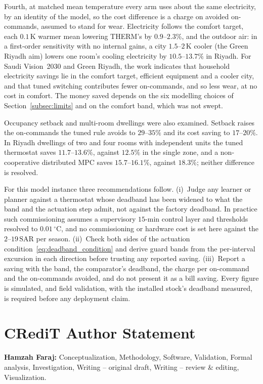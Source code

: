 \documentclass[3p,twocolumn,number]{elsarticle}
\newcommand{\SAR}{\text{SAR}}
\begin{document}
Fourth, at matched mean temperature every arm uses about the same electricity, by an identity of the model, so the cost difference is a charge on avoided on-commands, assumed to stand for wear. Electricity follows the comfort target, each $0.1\,$K warmer mean lowering THERM's by $0.9$--$2.3\%$, and the outdoor air: in a first-order sensitivity with no internal gains, a city $1.5$--$2\,$K cooler (the Green Riyadh aim) lowers one room's cooling electricity by $10.5$--$13.7\%$ in Riyadh. For Saudi Vision~2030 and Green Riyadh, the work indicates that household electricity savings lie in the comfort target, efficient equipment and a cooler city, and that tuned switching contributes fewer on-commands, and so less wear, at no cost in comfort. The money saved depends on the six modelling choices of Section~\ref{subsec:limits} and on the comfort band, which was not swept.

Occupancy setback and multi-room dwellings were also examined. Setback raises the on-commands the tuned rule avoids to $29$--$35\%$ and its cost saving to $17$--$20\%$. In Riyadh dwellings of two and four rooms with independent units the tuned thermostat saves $11.7$--$13.6\%$, against $12.5\%$ in the single zone, and a non-cooperative distributed MPC saves $15.7$--$16.1\%$, against $18.3\%$; neither difference is resolved.

For this model instance three recommendations follow. (i)~Judge any learner or planner against a thermostat whose deadband has been widened to what the band and the actuation step admit, not against the factory deadband. In practice such commissioning assumes a supervisory $15$-min control layer and thresholds resolved to $0.01\,^\circ$C, and no commissioning or hardware cost is set here against the $2$--$19\,\SAR$ per season. (ii)~Check both sides of the actuation condition~\eqref{eq:deadband_condition} and derive guard bands from the per-interval excursion in each direction before trusting any reported saving. (iii)~Report a saving with the band, the comparator's deadband, the charge per on-command and the on-commands avoided, and do not present it as a bill saving. Every figure is simulated, and field validation, with the installed stock's deadband measured, is required before any deployment claim.

\section{CRediT Author Statement}
\textbf{Hamzah Faraj:} Conceptualization, Methodology, Software, Validation, Formal analysis, Investigation, Writing -- original draft, Writing -- review \& editing, Visualization.
\end{document}
